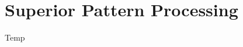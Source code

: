 \documentclass[./thoughthist.tex]{subfiles}
\begin{document}
\chapter{Superior Pattern Processing}
\newpage

Temp\autocite{spphumans}
\end{document}
